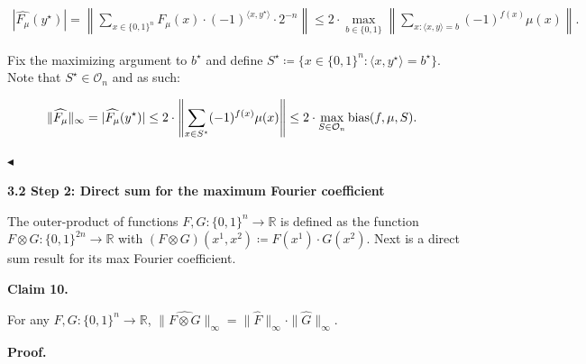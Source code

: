 \documentclass[10pt,a4paper]{article}
\begin{document}
\[\begin{gathered}
\displaystyle|\widehat{F_{\mu}}(y^{\star})|=\left\|\sum_{x\in\{0,1\}^{n}}F_{\mu}(x)\cdot(-1)^{\langle x,y^{\star}\rangle}\cdot 2^{-n}\right\|\leq 2\cdot\max_{b\in\{0,1\}}\left\|\sum_{x:\langle x,y\rangle=b}(-1)^{f(x)}\mu(x)\right\|.
\end{gathered}\]


Fix the maximizing argument to $b^{\star}$ and define $S^{\star}\coloneqq\{x\in\{0,1\}^{n}:\langle x,y^{\star}\rangle=b^{\star}\}$. Note that $S^{\star}\in\mathcal{O}_{n}$ and as such:\par


\[\begin{gathered}
\|\widehat{F_{\mu}}\|_{\infty}=|\widehat{F_{\mu}}(y^{\star})|\leq 2\cdot\left\|\sum_{x\in S^{\star}}(-1)^{f(x)}\mu(x)\right\|\leq 2\cdot\max_{S\in\mathcal{O}_{n}}{\textup{bias}}(f,\mu,S).\
\end{gathered}\]


$\blacktriangleleft$\par







\par\medskip\noindent\textbf{
3.2 Step 2: Direct sum for the maximum Fourier coefficient}\par




The outer-product of functions $F,G:\{0,1\}^{n}\to\mathbb{R}$ is defined as the function $F\otimes G:\{0,1\}^{2n}\to\mathbb{R}$ with $(F\otimes G)(x^{1},x^{2})\coloneqq F(x^{1})\cdot G(x^{2})$. Next is a direct sum result for its max Fourier coefficient.\par





\par\medskip\noindent\textbf{
Claim 10. 
}\par



For any $F,G:\{0,1\}^{n}\to\mathbb{R}$, $\|\widehat{F\otimes G}\|_{\infty}=\|\widehat{F}\|_{\infty}\cdot\|\widehat{G}\|_{\infty}$.\par






\par\medskip\noindent\textbf{
\textbf{Proof}.}\par
\end{document}
